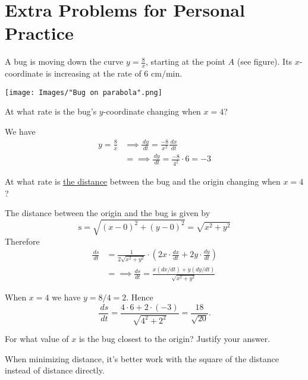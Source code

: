\documentclass[handout, nooutcomes]{ximera}
\renewenvironment{freeResponse}{
\ifhandout\setbox0\vbox\bgroup\else
\begin{trivlist}\item[\hskip \labelsep\bfseries Solution:\hspace{2ex}]
\fi}
{\ifhandout\egroup\else
\end{trivlist}
\fi}
\renewcommand{\d}{\,d}
\begin{document}
\section{Extra Problems for Personal Practice}
\begin{problem}
  A bug is moving down the curve $y = \frac{8}{x}$, starting at the point $A$ (see figure).
  Its $x$-coordinate is increasing at the rate of 6 cm/min.
  \begin{image}
    \texttt{[image: Images/"Bug on parabola".png]}
  \end{image}
  \begin{itemize}
    \item[(i)]
      At what rate is the bug's $y$-coordinate changing when $x = 4$?
      \begin{freeResponse}
        We have
        \begin{align*}
          y = \frac{8}{x} &\implies \frac{\d y}{\d t} = \frac{-8}{x^2} \frac{\d x}{\d t} \\
          &= \implies \frac{\d y}{\d t} = \frac{-8}{4^2} \cdot 6 = -3
        \end{align*}
      \end{freeResponse}

    \item[(ii)]
      At what rate is \underline{the distance} between the bug and the origin changing when $x = 4$?
      \begin{freeResponse}
        The distance between the origin and the bug is given by
        \[
          \text{s} = \sqrt{(x- 0)^2 + (y - 0)^2} = \sqrt{x^2 + y^2}
        \]
        Therefore
        \begin{align*}
          \frac{\d s}{\d t} &= \frac{1}{2\sqrt{x^2+y^2}}\cdot \left(2 x \cdot \frac{dx}{dt} + 2y \cdot\frac{dy}{dt}\right) \\
          &= \implies \frac{ds}{dt} = \frac{x (dx/dt) + y (dy/dt)}{\sqrt{x^2+y^2}}
        \end{align*}

        When $x = 4$ we have $y = 8/4 = 2$.
        Hence
        \[
          \frac{\d s}{\d t} = \frac{4 \cdot 6 + 2 \cdot (-3)}{\sqrt{4^2 + 2^2}} = \frac{18}{\sqrt{20}}.
        \]
      \end{freeResponse}

    \item[(iii)]
      For what value of $x$ is the bug closest to the origin?
      Justify your answer.
      \begin{freeResponse}
        When minimizing distance, it's better work with the square of the distance instead of distance directly.


\end{freeResponse}
\end{itemize}
\end{problem}
\end{document}
